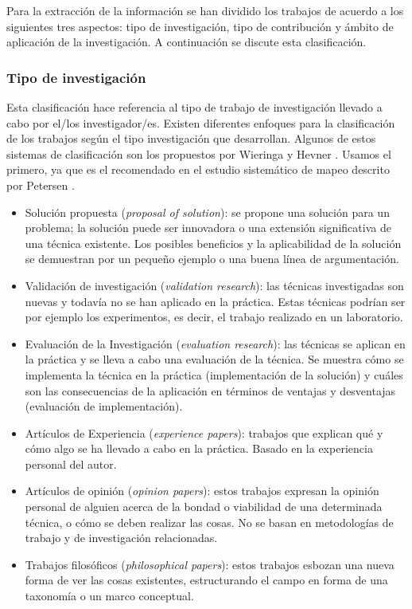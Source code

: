 Para la extracción de la información se han dividido los trabajos de acuerdo a los siguientes tres aspectos: tipo de investigación, tipo de contribución y ámbito de aplicación de la investigación. A continuación se discute esta clasificación.

\subsubsection{Tipo de investigación}
Esta clasificación hace referencia al tipo de trabajo de investigación llevado a cabo por el/los investigador/es. Existen diferentes enfoques para la clasificación de los trabajos según el tipo investigación que desarrollan. Algunos de estos sistemas de clasificación son los propuestos por Wieringa \cite{Wieringa:2005} y Hevner \cite{Hevner:2004}. Usamos el primero, ya que es el recomendado en el estudio sistemático de mapeo descrito por Petersen \cite{Petersen:2008}.
\begin{itemize}
\item Solución propuesta (\emph{proposal of solution}): se propone una solución para un problema; la solución puede ser innovadora o una extensión significativa de una técnica existente. Los posibles beneficios y la aplicabilidad de la solución se demuestran por un pequeño ejemplo o una buena línea de argumentación.
\item Validación de investigación (\emph{validation research}): las técnicas investigadas son nuevas y todavía no se han aplicado en la práctica. Estas técnicas podrían ser por ejemplo los experimentos, es decir, el trabajo realizado en un laboratorio.
\item Evaluación de la Investigación (\emph{evaluation research}): las técnicas se aplican en la práctica y se lleva a cabo una evaluación de la técnica. Se muestra cómo se implementa la técnica en la práctica (implementación de la solución) y cuáles son las consecuencias de la aplicación en términos de ventajas y desventajas (evaluación de implementación).
\item Artículos de Experiencia (\emph{experience papers}): trabajos que explican qué y cómo algo se ha llevado a cabo en la práctica. Basado en la experiencia personal del autor.
\item Artículos de opinión (\emph{opinion papers}): estos trabajos expresan la opinión personal de alguien acerca de la bondad o viabilidad de una determinada técnica, o cómo se deben realizar las cosas. No se basan en metodologías de trabajo y de investigación relacionadas.
\item Trabajos filosóficos (\emph{philosophical papers}): estos trabajos esbozan una nueva forma de ver las cosas existentes, estructurando el campo en forma de una taxonomía o un marco conceptual.
\end{itemize}

